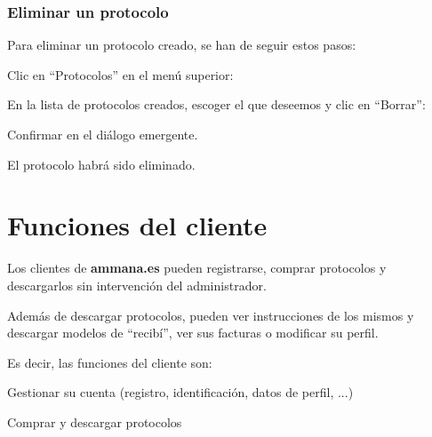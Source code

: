 \documentclass[12pt, spanish]{article}
\newcommand{\screenshot}[2][1]{

        \medskip
        \begin{minipage}[t]{\linewidth}
            \raggedright
            \adjustbox{valign=t}{%
                \fbox{\texttt{[image: \#2]}}
            }
        \end{minipage}
}
\begin{document}

    \newpage

    \subsubsection{Eliminar un protocolo}

    \label{sec:delete-protocol}

        Para eliminar un protocolo creado, se han de seguir estos pasos:

    \begin{steps}

        \item Clic en ``Protocolos'' en el menú superior:
            \screenshot{delete-protocol/1.png}

        \item En la lista de protocolos creados, escoger el que deseemos y clic en ``Borrar'':
            \screenshot{delete-protocol/2.png}

        \item Confirmar en el diálogo emergente.

        \item El protocolo habrá sido eliminado.

    \end{steps}


    \newpage

    \section{Funciones del cliente}

            Los clientes de \textbf{ammana.es} pueden registrarse, comprar protocolos y 
        descargarlos sin intervención del administrador.

            Además de descargar protocolos, pueden ver instrucciones de los mismos y descargar
        modelos de ``recibí'', ver sus facturas o modificar su perfil.

        Es decir, las funciones del cliente son:

        \begin{steps}
            \item Gestionar su cuenta (registro, identificación, datos de perfil, ...)
            \item Comprar y descargar protocolos
        \end{steps}
\end{document}
